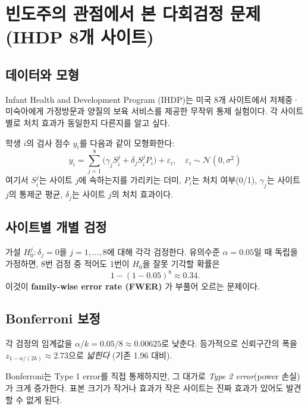\documentclass[11pt,a4paper]{article}
\newcommand{\Normal}{\mathcal{N}}
\begin{document}
\section{빈도주의 관점에서 본 다회검정 문제 (IHDP 8개 사이트)}

\subsection{데이터와 모형}

Infant Health and Development Program (IHDP)는 미국 8개 사이트에서 저체중·미숙아에게 가정방문과 양질의 보육 서비스를 제공한 무작위 통제 실험이다.
각 사이트별로 처치 효과가 동일한지 다른지를 알고 싶다.

학생 $i$의 검사 점수 $y_i$를 다음과 같이 모형화한다:
\begin{equation}
\label{eq:classical}
  y_i = \sum_{j=1}^{8}\bigl(\gamma_j S_i^j + \delta_j S_i^j P_i\bigr) + \varepsilon_i,
  \quad \varepsilon_i \sim \Normal(0,\sigma^2)
\end{equation}
여기서 $S_i^j$는 사이트 $j$에 속하는지를 가리키는 더미, $P_i$는 처치 여부(0/1), $\gamma_j$는 사이트 $j$의 통제군 평균, $\delta_j$는 사이트 $j$의 처치 효과이다.

\subsection{사이트별 개별 검정}

가설 $H_0^j: \delta_j = 0$을 $j=1,\dots,8$에 대해 각각 검정한다.
유의수준 $\alpha=0.05$일 때 독립을 가정하면, 8번 검정 중 적어도 1번이 $H_0$을 잘못 기각할 확률은
\[ 1 - (1-0.05)^8 \approx 0.34. \]
이것이 \textbf{family-wise error rate (FWER)} 가 부풀어 오르는 문제이다.

\subsection{Bonferroni 보정}

각 검정의 임계값을 $\alpha/k = 0.05/8 \approx 0.00625$로 낮춘다.
등가적으로 신뢰구간의 폭을 $z_{1-\alpha/(2k)} \approx 2.73$으로 \emph{넓힌다} (기존 1.96 대비).

\begin{warn}
Bonferroni는 Type 1 error를 직접 통제하지만, 그 대가로 \emph{Type 2 error}(power 손실)가 크게 증가한다.
표본 크기가 작거나 효과가 작은 사이트는 진짜 효과가 있어도 발견할 수 없게 된다.
\end{warn}
\end{document}
